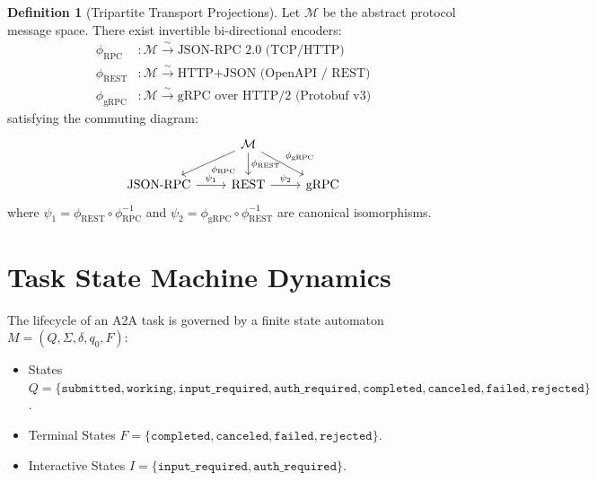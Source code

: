 \documentclass[11pt,twoside,openright]{report}
\theoremstyle{definition}
\newtheorem{definition}{Definition}[chapter]
\theoremstyle{plain}
\theoremstyle{remark}
\begin{document}
\begin{definition}[Tripartite Transport Projections]
Let $\mathcal{M}$ be the abstract protocol message space. There exist invertible bi-directional encoders:
\begin{align*}
\phi_{\mathrm{RPC}} &: \mathcal{M} \xrightarrow{\sim} \text{JSON-RPC 2.0 (TCP/HTTP)} \\
\phi_{\mathrm{REST}} &: \mathcal{M} \xrightarrow{\sim} \text{HTTP+JSON (OpenAPI / REST)} \\
\phi_{\mathrm{gRPC}} &: \mathcal{M} \xrightarrow{\sim} \text{gRPC over HTTP/2 (Protobuf v3)}
\end{align*}
satisfying the commuting diagram:
\begin{equation}
\begin{tikzcd}
& \mathcal{M} \arrow[dl, "\phi_{\mathrm{RPC}}"', swap] \arrow[d, "\phi_{\mathrm{REST}}"] \arrow[dr, "\phi_{\mathrm{gRPC}}"] & \\
\text{JSON-RPC} \arrow[r, "\psi_{1}"] & \text{REST} \arrow[r, "\psi_{2}"] & \text{gRPC}
\end{tikzcd}
\end{equation}
where $\psi_1 = \phi_{\mathrm{REST}} \circ \phi_{\mathrm{RPC}}^{-1}$ and $\psi_2 = \phi_{\mathrm{gRPC}} \circ \phi_{\mathrm{REST}}^{-1}$ are canonical isomorphisms.
\end{definition}

\section{Task State Machine Dynamics}
The lifecycle of an A2A task is governed by a finite state automaton $M = (Q, \Sigma, \delta, q_0, F)$:
\begin{itemize}
    \item States $Q = \{\texttt{submitted}, \texttt{working}, \texttt{input\_required}, \texttt{auth\_required}, \texttt{completed}, \texttt{canceled}, \texttt{failed}, \texttt{rejected}\}$.
    \item Terminal States $F = \{\texttt{completed}, \texttt{canceled}, \texttt{failed}, \texttt{rejected}\}$.
    \item Interactive States $I = \{\texttt{input\_required}, \texttt{auth\_required}\}$.
\end{itemize}
\end{document}

